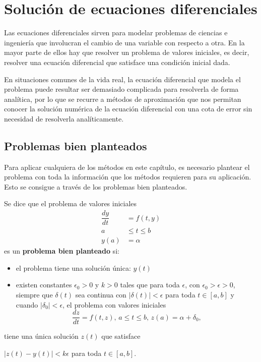 \chapter{Solución de ecuaciones diferenciales}

Las ecuaciones diferenciales sirven para modelar problemas de ciencias e ingeniería que involucran el cambio de una 
variable con respecto a otra. En la mayor parte de ellos hay que resolver un problema de valores iniciales, es decir, 
resolver una ecuación diferencial que satisface una condición inicial dada.

En situaciones comunes de la vida real, la ecuación diferencial que modela el problema puede resultar ser demasiado 
complicada para resolverla de forma analítica, por lo que se recurre a métodos de aproximación que nos permitan conocer 
la solución numérica de la ecuación diferencial con una cota de error sin necesidad de resolverla analíticamente.

\section{Problemas bien planteados}
Para aplicar cualquiera de los métodos en este capítulo, es necesario plantear el problema con toda la información
que los métodos requieren para su aplicación. Esto se consigue a través de los problemas bien planteados.

\begin{definition}
	Se dice que el problema de valores iniciales
	\begin{align}
		\dfrac{dy}{dt} &= f(t,y) \nonumber\\
		a&\leq t\leq b \nonumber\\
		y(a)&=\alpha
		\label{eq:EDBienPlanteada}
	\end{align}
	es un \textbf{problema bien planteado} si:
	\begin{itemize}
		\item el problema tiene una solución única: $y(t)$
		\item existen constantes $\epsilon_0>0$ y $k>0$ tales que para toda $\epsilon$, con $\epsilon_0>\epsilon>0$, siempre que $\delta(t)$ sea continua con
			$|\delta (t)|<\epsilon$ para toda $t\in [a,b]$ y cuando $|\delta_0| < \epsilon$, el problema con valores iniciales
			\begin{equation}
				\dfrac{dz}{dt} = f(t,z), \, a\leq t\leq b, \, z(a) = \alpha + \delta_0,
			\end{equation}
	\end{itemize}
	tiene una única solución $z(t)$ que satisface
	\begin{center}
		$|z(t) - y(t)| < k\epsilon$ para toda $t\in [a,b]$.
	\end{center}	 
\end{definition}


